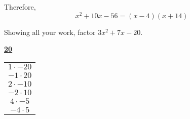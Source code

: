 \documentclass[11pt,letterpaper]{article}
\begin{document}
Therefore,
	\[
	x^2 + 10x - 56= (x - 4)(x + 14)
	\]



\newpage



 Showing all your work, factor $3x^2 + 7x - 20$. \pspace

\sol 
	\begin{table}[!ht]
	\centering
	\underline{\bfseries 20} \pvspace{0.1cm}
	\begin{tabular}{c}
	$1 \cdot -20$ \\
	$-1 \cdot 20$ \\
	$2 \cdot -10$ \\
	$-2 \cdot 10$ \\
	$4 \cdot -5$ \\
	$-4 \cdot 5$
	\end{tabular}
	\end{table}
\end{document}
